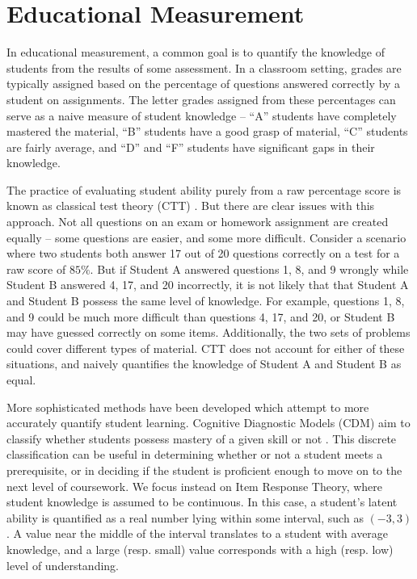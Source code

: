 \section*{Educational Measurement}
In educational measurement, a common goal is to quantify the knowledge of students from the results of some assessment. In a classroom setting, grades are typically assigned based on the percentage of questions answered correctly by a student on assignments. The letter grades assigned from these percentages can serve as a naive measure of student knowledge -- ``A'' students have completely mastered the material, ``B'' students have a good grasp of material, ``C'' students are fairly average, and ``D'' and ``F'' students have significant gaps in their knowledge.

The practice of evaluating student ability purely from a raw percentage score is known as classical test theory (CTT) \cite{thissen}. But there are clear issues with this approach. Not all questions on an exam or homework assignment are created equally -- some questions are easier, and some more difficult. Consider a scenario where two students both answer 17 out of 20 questions correctly on a test for a raw score of $85\%$. But if Student A answered questions 1, 8, and 9 wrongly while Student B answered 4, 17, and 20 incorrectly, it is not likely that that Student A and Student B possess the same level of knowledge. For example, questions 1, 8, and 9 could be much more difficult than questions 4, 17, and 20, or Student B may have guessed correctly on some items. Additionally, the two sets of problems could cover different types of material. CTT does not account for either of these situations, and naively quantifies the knowledge of Student A and Student B as equal.

More sophisticated methods have been developed which attempt to more accurately quantify student learning. Cognitive Diagnostic Models (CDM) aim to classify whether students possess mastery of a given skill or not \cite{sinharay2007}. This discrete classification can be useful in determining whether or not a student meets a prerequisite, or in deciding if the student is proficient enough to move on to the next level of coursework. We focus instead on Item Response Theory, where student knowledge is assumed to be continuous. In this case, a student's latent ability is quantified as a real number lying within some interval, such as $(-3,3)$. A value near the middle of the interval translates to a student with average knowledge, and a large (resp. small) value corresponds with a high (resp. low) level of understanding.

